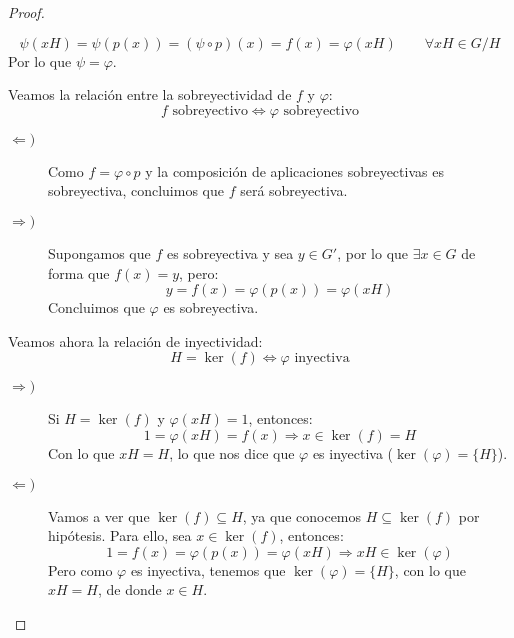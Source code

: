 \begin{teo}
\begin{proof}
\begin{itemize}
                \begin{equation*}
                    \psi(xH) = \psi(p(x)) = (\psi\circ p)(x) = f(x) = \varphi(xH) \qquad \forall xH\in G/H
                \end{equation*}
                Por lo que $\psi = \varphi$.
        \end{itemize}
        Veamos la relación entre la sobreyectividad de $f$ y $\varphi$:
        \begin{equation*}
            f \text{\ sobreyectivo} \Longleftrightarrow \varphi \text{\ sobreyectivo}
        \end{equation*}
        \begin{description}
            \item [$\Longleftarrow)$] Como $f = \varphi\circ p$ y la composición de aplicaciones sobreyectivas es sobreyectiva, concluimos que $f$ será sobreyectiva.
            \item [$\Longrightarrow)$] Supongamos que $f$ es sobreyectiva y sea $y\in G'$, por lo que $\exists x\in G$ de forma que $f(x) = y$, pero:
                \begin{equation*}
                    y = f(x) = \varphi(p(x)) = \varphi(xH)
                \end{equation*}
                Concluimos que $\varphi$ es sobreyectiva.
        \end{description}
        Veamos ahora la relación de inyectividad:
        \begin{equation*}
            H = \ker(f) \Longleftrightarrow \varphi \text{\ inyectiva}
        \end{equation*}
        \begin{description}
            \item [$\Longrightarrow)$] Si $H=\ker(f)$ y $\varphi(xH) = 1$, entonces:
                \begin{equation*}
                    1 = \varphi(xH) = f(x) \Longrightarrow x\in \ker(f) = H
                \end{equation*}
                Con lo que $xH = H$, lo que nos dice que $\varphi$ es inyectiva ($\ker(\varphi)=\{H\}$).
            \item [$\Longleftarrow)$] Vamos a ver que $\ker(f) \subseteq H$, ya que conocemos $H\subseteq \ker(f)$ por hipótesis. Para ello, sea $x\in \ker(f)$, entonces:
                \begin{equation*}
                    1 = f(x) = \varphi(p(x)) = \varphi(xH) \Longrightarrow xH\in \ker(\varphi)
                \end{equation*}
                Pero como $\varphi$ es inyectiva, tenemos que $\ker(\varphi) = \{H\}$, con lo que $xH = H$, de donde $x\in H$.
        \end{description}
    \end{proof}
\end{teo}

